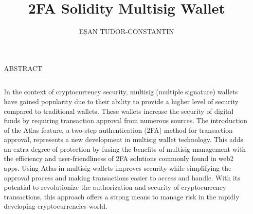 \documentclass[12pt]{report}
\begin{document}
\title{2FA Solidity Multisig Wallet}					   
\author{EȘAN TUDOR-CONSTANTIN}											
				
\maketitle

\newpage
\thispagestyle{empty}
\mbox{}
\newpage
{} 

\cleardoublepage
ABSTRACT
\vspace{0.5cm}	
\hrule
\vspace{0.5cm}	

In the context of cryptocurrency security, multisig (multiple signature) wallets have gained popularity due to their ability to provide a higher level of security compared to traditional wallets. These wallets increase the security of digital funds by requiring transaction approval from numerous sources. The introduction of the Atlas feature, a two-step authentication (2FA) method for transaction approval, represents a new development in multisig wallet technology. This adds an extra degree of protection by fusing the benefits of multisig management with the efficiency and user-friendliness of 2FA solutions commonly found in web2 apps. Using Atlas in multisig wallets improves security while simplifying the approval process and making transactions easier to access and handle. With its potential to revolutionize the authorization and security of cryptocurrency transactions, this approach offers a strong means to manage risk in the rapidly developing cryptocurrencies world.














\tableofcontents


\newpage
{}











\end{document}

